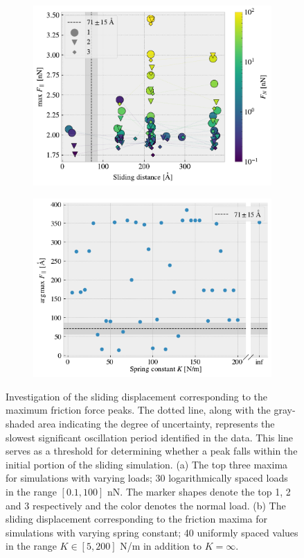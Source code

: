 \begin{figure}[H]
  \centering
  \begin{subfigure}[t]{0.49\textwidth}
      \centering
      \includegraphics[width=\textwidth]{figures/baseline/max_dist.pdf}
      \caption{}
        \label{fig:max_dist}
    \end{subfigure}
    \hfill
    \begin{subfigure}[t]{0.49\textwidth}
      \centering
      \includegraphics[width=\textwidth]{figures/baseline/max_vs_K}
      \caption{}
      \label{fig:max_vs_K}
    \end{subfigure}
    \caption{Investigation of the sliding displacement corresponding to the maximum friction force peaks. The dotted line, along with the gray-shaded area indicating the degree of uncertainty, represents the slowest significant oscillation period identified in the data. This line serves as a threshold for determining whether a peak falls within the initial portion of the sliding simulation. (a) The top three maxima for simulations with varying loads; 30 logarithmically spaced loads in the range $[0.1, 100]$ nN. The marker shapes denote the top 1, 2 and 3 respectively and the color denotes the normal load. (b) The sliding displacement corresponding to the friction maxima for simulations with varying spring constant; 40 uniformly spaced values in the range $K \in [5, 200]$ N/m in addition to $K = \infty$.}

\end{figure}
